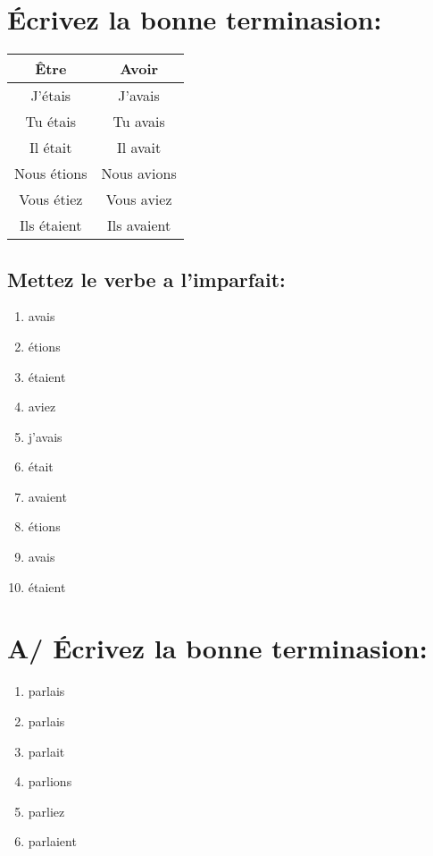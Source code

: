 \section{Écrivez la bonne terminasion:}

\begin{center}
    \begin{tabular}{|c|c|}
        \hline
        Être & Avoir \\
        \hline
        J'étais & J'avais \\
        Tu étais & Tu avais \\
        Il était & Il avait \\
        Nous étions & Nous avions \\
        Vous étiez & Vous aviez \\
        Ils étaient & Ils avaient \\
        \hline
    \end{tabular}
\end{center}

\subsection{Mettez le verbe a l'imparfait:}

\begin{enumerate}
    \item avais
    \item étions
    \item étaient
    \item aviez
    \item j'avais
    \item était
    \item avaient
    \item étions
    \item avais 
    \item étaient
\end{enumerate}

\section{A/ Écrivez la bonne terminasion:}

\begin{enumerate}
    \item parlais
    \item parlais
    \item parlait
    \item parlions
    \item parliez
    \item parlaient
\end{enumerate}


